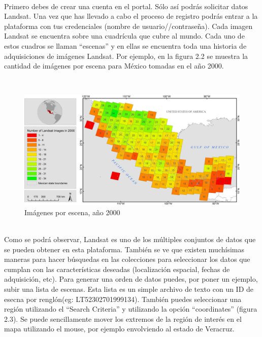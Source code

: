\\

Primero debes de crear una cuenta en el portal. Sólo así podrás solicitar datos Landsat. Una vez que has llevado a cabo el proceso de registro podrás entrar a la plataforma con tus credenciales (nombre de usuario//contraseña). Cada imagen Landsat se encuentra sobre una cuadrícula que cubre al mundo. Cada uno de estos cuadros se llaman "`escenas"' y en ellas se encuentra toda una historia de adquisiciones de imágenes Landsat. Por ejemplo, en la figura 2.2 se muestra la cantidad de imágenes por escena para México tomadas en el año 2000.

\\

\begin{figure}[h!]
\begin{center}
\leavevmode
\includegraphics[width=5in]{6_escenas_landsat.png}
\end{center}
\caption{Imágenes por escena, año 2000}
\end{figure}

\\

Como se podrá observar, Landsat es uno de los múltiples conjuntos de datos que se pueden obtener en esta plataforma. También se ve que existen muchísimas maneras para hacer búsquedas en las colecciones para seleccionar los datos que cumplan con las características deseadas (localización espacial, fechas de adquisición, etc). Para generar una orden de datos puedes, por poner un ejemplo, subir una lista de escenas. Esta lista es un simple archivo de texto con un ID de esecna por renglón(eg: LT52302701999134). También puedes seleccionar una región utilizando el "`Search Criteria"' y utilizando la opción "`coordinates"' (figura 2.3). Se puede sencillamente mover los extremos de la región de interés en el mapa utilizando el mouse, por ejemplo envolviendo al estado de Veracruz.\\

